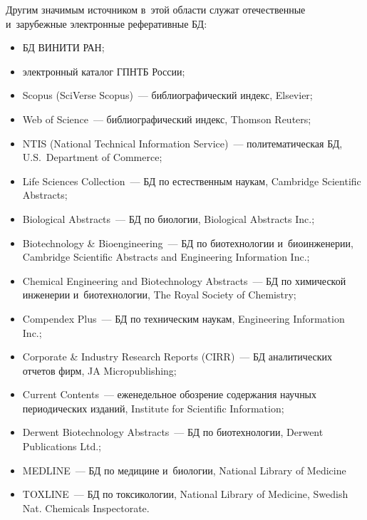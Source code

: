 \begin{multicols}{2}
    Другим значимым источником в~этой области служат отечественные 
и~зарубежные электронные реферативные БД:
    \begin{itemize}
\item БД ВИНИТИ РАН;
\item электронный каталог ГПНТБ России;
\item Scopus (SciVerse Scopus)~--- библиографический индекс, Elsevier;
\item Web of Science~--- библиографический индекс, Thomson Reuters;
\item NTIS (National Technical Information Service)~--- политематическая 
БД, U.S.\ Department of Commerce;
\item Life Sciences Collection~--- БД по естественным наукам, 
Cambridge Scientific Abstracts;
\item Biological Abstracts~--- БД по биологии, Biological Abstracts 
Inc.;
\item Biotechnology \& Bioengineering~--- БД по биотехнологии 
и~биоинженерии, Cambridge Scientific Abstracts and Engineering Information Inc.;
\item Chemical Engineering and Biotechnology Abstracts~--- БД по 
химической инженерии и~биотехнологии, The Royal Society of Chemistry;
\item Compendex Plus~--- БД по техническим наукам, Engineering 
Information Inc.;
\item Corporate \& Industry Research Reports (CIRR)~--- БД
аналитических отчетов фирм, JA Micropublishing;
\item Current Contents~--- еженедельное обозрение содержания научных 
периодических изданий, Institute for Scientific Information;
\item Derwent Biotechnology Abstracts~--- БД по биотехнологии, 
Derwent Publications Ltd.;
\item MEDLINE~--- БД по медицине и~биологии, National Library of 
Medicine
\item TOXLINE~--- БД по токсикологии, National Library of 
Medicine, Swedish Nat. Chemicals Inspectorate.
\end{itemize}


\end{multicols}
